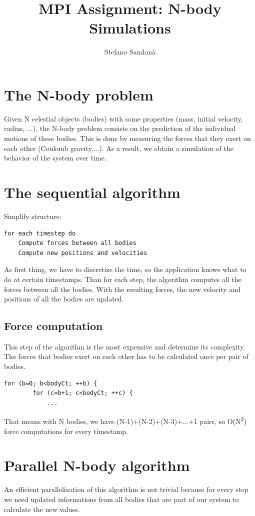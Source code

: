 \documentclass[a4paper]{article}
\begin{document}
\title{MPI Assignment: N-body Simulations}
\author{Stefano Sandonà}
\date{}
		
\maketitle

\section{The N-body problem}
\label{sec:nbody_problem}
Given N celestial objects (bodies) with some properties (mass, initial velocity, radius, ...), the N-body problem consists on the  prediction of the individual motions of these bodies. This is done by measuring the forces that they exert on each other (Coulomb gravity,...). As a result, we obtain a simulation of the behavior of the system over time.  

\section{The sequential algorithm}
\label{sec:seq_algo}
Simplify structure:
\begin{lstlisting}
for each timestep do
	Compute forces between all bodies
	Compute new positions and velocities
\end{lstlisting}

As first thing, we have to discretize the time, so the application knows what to do at certain timestamps. Than for each step, the algorithm computes all the forces between all the bodies. With the resulting forces, the new velocity and positions of all the bodies are updated.

\subsection{Force computation}
\label{sec:force_comp_seq}
This step of the algorithm is the most expensive and determine its complexity.
The forces that bodies exert on each other has to be calculated once per pair of bodies.
\begin{lstlisting}
for (b=0; b<bodyCt; ++b) {
		for (c=b+1; c<bodyCt; ++c) {
			...
\end{lstlisting}
That means with N bodies, we have (N-1)+(N-2)+(N-3)+...+1 pairs, so O(N\textsuperscript{2}) force computations for every timestamp.

\section{Parallel N-body algorithm}
\label{sec:par}
An efficient parallelization of this algorithm is not trivial because for every step we need updated informations from all bodies that are part of our system to calculate the new values. 
\end{document}
